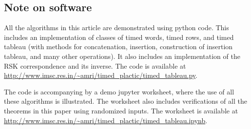 \documentclass[10pt]{amsproc}
\theoremstyle{definition}
\theoremstyle{remark}
\begin{document}
\subsection{Note on software}
\label{sec:software}
All the algorithms in this article are demonstrated using python code.
This includes an implementation of classes of timed words, timed rows, and timed tableau (with methods for concatenation, insertion, construction of insertion tableau, and many other operations).
It also includes an implementation of the RSK correspondence and its inverse.
The code is available at \url{http://www.imsc.res.in/~amri/timed_plactic/timed_tableau.py}.

The code is accompanying by a demo jupyter worksheet, where the use of all these algorithms is illustrated.
The worksheet also includes verifications of all the theorems in this paper using randomized inputs.
The worksheet is available at \url{http://www.imsc.res.in/~amri/timed_plactic/timed_tableau.ipynb}.


\end{document}
